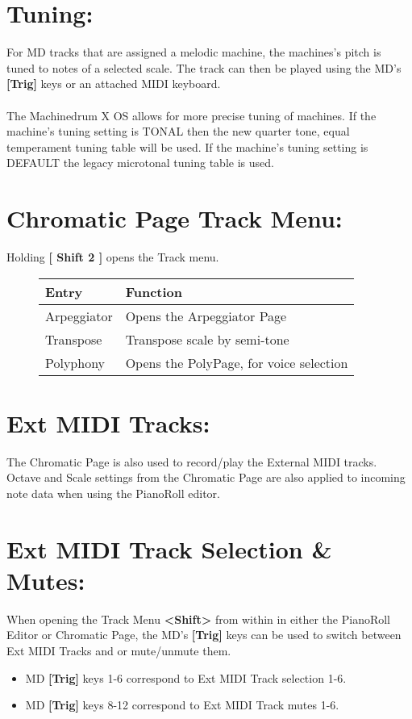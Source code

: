 \section{Tuning:}
For MD tracks that are assigned a melodic machine, the machines’s pitch is tuned to notes of a selected scale. The track can then be played using the MD's \textbf{[Trig]} keys or an attached MIDI keyboard.\\\\
The Machinedrum X OS allows for more precise tuning of machines. If the machine's tuning setting is TONAL then the new quarter tone, equal temperament tuning table will be used. If the machine's tuning setting is DEFAULT the legacy microtonal tuning table is used.
\\
\section{Chromatic Page Track Menu:}
Holding \textbf{[ Shift 2 ]} opens the Track menu.
\begin{figure}[hb]
    \begin{tabular}{|l|l|}
    \hline
    \rowcolor[HTML]{C0C0C0} 
    Entry            & Function \\ \hline
    Arpeggiator      & Opens the Arpeggiator Page \\ \hline
    Transpose        & Transpose scale by semi-tone\\ \hline
    Polyphony        & Opens the PolyPage, for voice selection\\ \hline
    \end{tabular}
\end{figure}
\newpage
\section{Ext MIDI Tracks:}
The Chromatic Page is also used to record/play the External MIDI tracks.
Octave and Scale settings from the Chromatic Page are also applied to incoming note data when using the PianoRoll editor.
\section{Ext MIDI Track Selection \& Mutes:}
When opening the Track Menu \textbf{<Shift>} from within in either the PianoRoll Editor or Chromatic Page, the MD's \textbf{[Trig]} keys can be used to switch between Ext MIDI Tracks and or  mute/unmute them.
\begin{itemize}
    \item MD \textbf{[Trig]} keys 1-6 correspond to Ext MIDI Track selection 1-6.
    \item MD \textbf{[Trig]} keys 8-12 correspond to Ext MIDI Track mutes 1-6.
\end{itemize}
